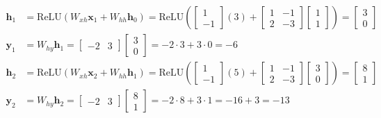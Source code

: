 \documentclass{article}
\newcommand{\x}{\mathbf{x}}
\newcommand{\h}{\mathbf{h}}
\newcommand{\y}{\mathbf{y}}
\begin{document}
\begin{probset}
\begin{prob}
    \begin{soln}
        \begin{align*}
            \h_1 &= \text{ReLU}(W_{xh} \x_1 + W_{hh} \h_0) = \text{ReLU}\left(\begin{bmatrix} 1 \\ -1 \end{bmatrix} (3) + \begin{bmatrix} 1 & -1 \\ 2 & -3 \end{bmatrix} \begin{bmatrix} 1 \\ 1 \end{bmatrix}\right) = \begin{bmatrix} 3 \\ 0 \end{bmatrix} \\
            \y_1 &= W_{hy} \h_1 = \begin{bmatrix} -2 & 3 \end{bmatrix} \begin{bmatrix} 3 \\ 0 \end{bmatrix} = -2 \cdot 3 + 3 \cdot 0 = -6 \\
            \h_2 &= \text{ReLU}(W_{xh} \x_2 + W_{hh} \h_1) = \text{ReLU}\left(\begin{bmatrix} 1 \\ -1 \end{bmatrix} (5) + \begin{bmatrix} 1 & -1 \\ 2 & -3 \end{bmatrix} \begin{bmatrix} 3 \\ 0 \end{bmatrix}\right) = \begin{bmatrix} 8 \\ 1 \end{bmatrix} \\
            \y_2 &= W_{hy} \h_2 = \begin{bmatrix} -2 & 3 \end{bmatrix} \begin{bmatrix} 8 \\ 1 \end{bmatrix} = -2 \cdot 8 + 3 \cdot 1 = -16 + 3 = -13
        \end{align*}
    \end{soln}
\end{prob}


\end{probset}
\end{document}
